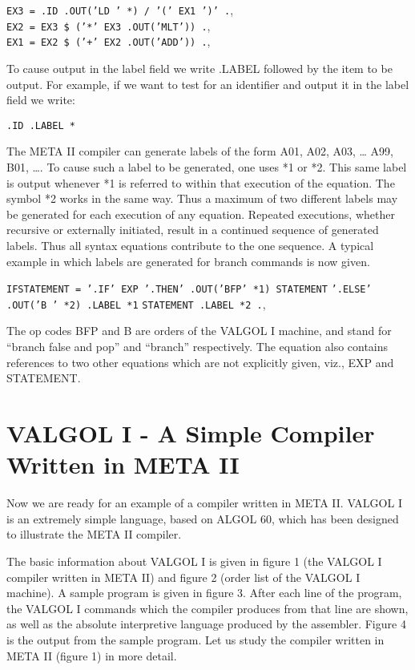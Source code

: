 \documentclass[twocolumn]{article}
\begin{document}
\begin{center}
{\tt EX3 = .ID .OUT('LD ' *) / '(' EX1 ')' .}, \\
{\tt EX2 = EX3 \$ ('*' EX3 .OUT('MLT')) .}, \\
{\tt EX1 = EX2 \$ ('+' EX2 .OUT('ADD')) .},
\end{center}

To cause output in the label field we write .LABEL followed by the item to
be output. 
For example, if we want to test for an identifier and output it in the label
field we write:

\begin{center}
{\tt .ID .LABEL *}
\end{center}

The META II compiler can generate labels of the form A01, A02, A03, \ldots
A99, B01, \ldots .
To cause such a label to be generated, one uses *1 or *2. This same label
is output whenever *1 is referred to within that execution of the equation.
The symbol *2 works in the same way.
Thus a maximum of two different labels may be generated for each execution
of any equation.
Repeated executions, whether recursive or externally initiated, result
in a continued sequence of generated labels.
Thus all syntax equations contribute to the one sequence.
A typical example in which labels are generated for branch commands
is now given.

\begin{center}
{\tt IFSTATEMENT = '.IF' EXP '.THEN' .OUT('BFP' *1) STATEMENT}
{\tt      '.ELSE' .OUT('B ' *2) .LABEL *1}
{\tt      STATEMENT .LABEL *2 .},
\end{center}

The op codes BFP and B are orders of the VALGOL I machine, and stand for
``branch false and pop'' and ``branch'' respectively.
The equation also contains references to two other equations which
are not explicitly given, viz., EXP and STATEMENT.

\section{VALGOL I - A Simple Compiler Written in META II}

Now we are ready for an example of a compiler written in META II.
VALGOL I is an extremely simple language, based on ALGOL 60, which has been
designed to illustrate the META II compiler.

The basic information about VALGOL I is given in figure 1 (the VALGOL I
compiler written in META II) and figure 2 (order list of the VALGOL I machine).
A sample program is given in figure 3.
After each line of the program, the VALGOL I commands which the compiler 
produces from that line are shown, as well as the absolute interpretive
language produced by the assembler.
Figure 4 is the output from the sample program.
Let us study the compiler written in META II (figure 1) in more detail.
\end{document}
